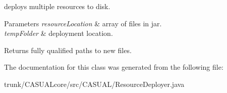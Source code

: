 deploys multiple resources to disk. 
\begin{DoxyParams}{Parameters}
{\em resource\-Location} & array of files in jar. \\
\hline
{\em temp\-Folder} & deployment location. \\
\hline
\end{DoxyParams}
\begin{DoxyReturn}{Returns}
fully qualified paths to new files. 
\end{DoxyReturn}


The documentation for this class was generated from the following file\-:\begin{DoxyCompactItemize}
\item 
trunk/\-C\-A\-S\-U\-A\-Lcore/src/\-C\-A\-S\-U\-A\-L/Resource\-Deployer.\-java\end{DoxyCompactItemize}
